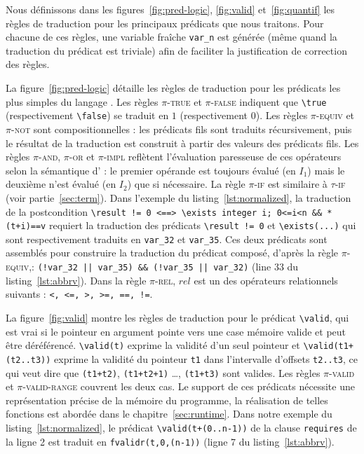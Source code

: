 Nous définissons dans les figures~\ref{fig:pred-logic}, \ref{fig:valid}
et~\ref{fig:quantif} les règles de traduction pour les principaux
prédicats \eacsl que nous traitons.
Pour chacune de ces règles, une variable fraîche \lstinline'var_n' est générée
(même quand la traduction du prédicat est triviale) afin de faciliter la
justification de correction des règles.



La figure~\ref{fig:pred-logic} détaille les règles de traduction pour les
prédicats les plus simples du langage \eacsl.
Les règles \textsc{$\pi$-true} et \textsc{$\pi$-false} indiquent que
\lstinline'\true' (respectivement \lstinline'\false') se traduit en $1$
(respectivement $0$).
Les règles \textsc{$\pi$-equiv} et \textsc{$\pi$-not} sont compositionnelles :
les prédicats fils sont traduits récursivement, puis le résultat de la
traduction est construit à partir des valeurs des prédicats fils.
Les règles \textsc{$\pi$-and}, \textsc{$\pi$-or} et \textsc{$\pi$-impl}
reflètent l'évaluation paresseuse de ces opérateurs selon la sémantique d'\eacsl
: le premier opérande est toujours évalué (en $I_1$) mais le deuxième n'est
évalué (en $I_2$) que si nécessaire.
La règle \textsc{$\pi$-if} est similaire à \textsc{$\tau$-if} (voir
partie~\ref{sec:term}).
Dans l'exemple du listing~\ref{lst:normalized}, la traduction de la
postcondition
\lstinline{\result != 0 <==> \exists integer i; 0<=i<n && *(t+i)==v} requiert
la traduction des prédicats \lstinline'\result != 0' et
\lstinline{\exists(...)} qui sont respectivement traduits en \lstinline'var_32'
et \lstinline'var_35'.
Ces deux prédicats sont assemblés pour construire la traduction du prédicat
composé, d'après la règle \textsc{$\pi$-equiv},:
\lstinline'(!var_32 || var_35) && (!var_35 || var_32)' (line 33 du
listing~\ref{lst:abbrv}).
Dans la règle \textsc{$\pi$-rel}, $rel$ est un des opérateurs relationnels
suivants : \lstinline[style=c]'<, <=, >, >=, ==, !='.



La figure~\ref{fig:valid} montre les règles de traduction pour le prédicat
\lstinline'\valid', qui est vrai si le pointeur en argument pointe vers une
case mémoire valide et peut être déréférencé.
\lstinline'\valid(t)' exprime la validité d'un seul pointeur et
\lstinline'\valid(t1+(t2..t3))' exprime la validité du pointeur \lstinline't1'
dans l'intervalle d'offsets \lstinline't2..t3', ce qui veut dire que
\lstinline'(t1+t2)', \lstinline'(t1+t2+1)' \dots, \lstinline'(t1+t3)' sont
valides.
Les règles \textsc{$\pi$-valid} et \textsc{$\pi$-valid-range} couvrent les deux
cas.
Le support de ces prédicats nécessite une représentation précise de la mémoire
du programme, la réalisation de telles fonctions est abordée dans le
chapitre~\ref{sec:runtime}.
Dans notre exemple du listing~\ref{lst:normalized}, le prédicat
\lstinline'\valid(t+(0..n-1))' de la clause \lstinline'requires' de la ligne 2
est traduit en \lstinline[style=c]'fvalidr(t,0,(n-1))' (ligne 7 du
listing~\ref{lst:abbrv}).

